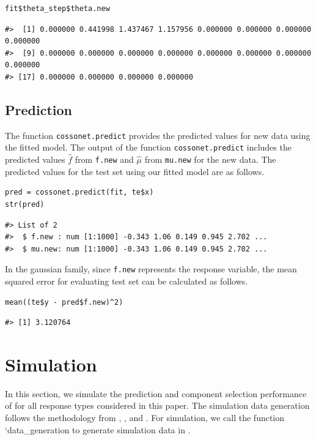 \begin{verbatim}
fit$theta_step$theta.new
\end{verbatim}

\begin{verbatim}
#>  [1] 0.000000 0.441998 1.437467 1.157956 0.000000 0.000000 0.000000 0.000000
#>  [9] 0.000000 0.000000 0.000000 0.000000 0.000000 0.000000 0.000000 0.000000
#> [17] 0.000000 0.000000 0.000000 0.000000
\end{verbatim}

\hypertarget{ssec4_3}{%
\subsection{Prediction}\label{ssec4_3}}

The function \texttt{cossonet.predict} provides the predicted values for new data using the fitted model. The output of the function \texttt{cossonet.predict} includes the predicted values \(\hat{f}\) from \texttt{f.new} and \(\hat{\mu}\) from \texttt{mu.new} for the new data. The predicted values for the test set using our fitted model are as follows.

\begin{verbatim}
pred = cossonet.predict(fit, te$x)
str(pred)
\end{verbatim}

\begin{verbatim}
#> List of 2
#>  $ f.new : num [1:1000] -0.343 1.06 0.149 0.945 2.702 ...
#>  $ mu.new: num [1:1000] -0.343 1.06 0.149 0.945 2.702 ...
\end{verbatim}

In the gaussian family, since \texttt{f.new} represents the response variable, the mean squared error for evaluating test set can be calculated as follows.

\begin{verbatim}
mean((te$y - pred$f.new)^2)
\end{verbatim}

\begin{verbatim}
#> [1] 3.120764
\end{verbatim}

\hypertarget{sec5}{%
\section{Simulation}\label{sec5}}

In this section, we simulate the prediction and component selection performance of  for all response types considered in this paper. The simulation data generation follows the methodology from \citet{Zhang:2006}, \citet{Lin:2006}, and \citet{Leng:2006}. For simulation, we call the function `data\_generation to generate simulation data in .

